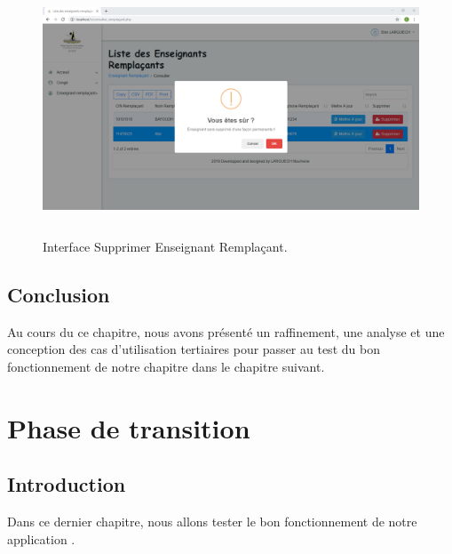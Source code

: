 \documentclass[12 pt ]{report}
\begin{document}
\begin{figure}[h]
 \begin{center}
\includegraphics[width= 18 cm ,height=7.5cm]{supprimer_rempacant.PNG}
\caption{Interface  Supprimer Enseignant Remplaçant. }

\end{center}
\end{figure}

\section*{Conclusion}  
Au cours du ce chapitre, nous avons présenté un raffinement, une analyse et une conception des cas d'utilisation tertiaires pour passer au test du bon fonctionnement de notre chapitre dans le chapitre suivant.
\chapter{Phase de transition}
\section*{Introduction}  
Dans ce dernier chapitre, nous allons tester le bon fonctionnement de notre application .
\end{document}

